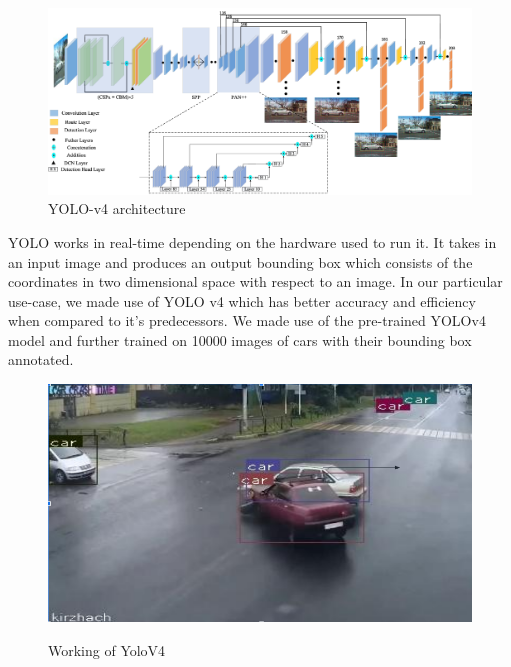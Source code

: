 \documentclass[ 12pt,a4paper,twocolumn,fleqn]{article}
\begin{document}
\begin{adjustwidth}{3.5em}{0pt}
\begin{figure}[h]
\begin{center}
    \hspace*{0.4in}
    \includegraphics[scale=0.4]{media/yolo_arch.png}
    \centering
  \caption{    YOLO-v4 architecture}
\end{center}
\end{figure}

\hspace{0.2cm}

YOLO works in real-time depending on the hardware used to run it. It takes in an input image and produces an output bounding box which consists of the coordinates in two dimensional space with respect to an image.
In our particular use-case, we made use of YOLO v4 which has better accuracy and efficiency when compared to it’s predecessors. We made use of the pre-trained YOLOv4 model and further trained on 10000 images of cars with their bounding box annotated.

\hspace{0.2cm}

\begin{figure}[H]
\begin{center}
    \hspace*{0.4in}
    \includegraphics[scale=0.5]{media/yolo.png}
    \\
  \caption{    Working of YoloV4}
\end{center}
\end{figure}


\end{adjustwidth}
\end{document}
